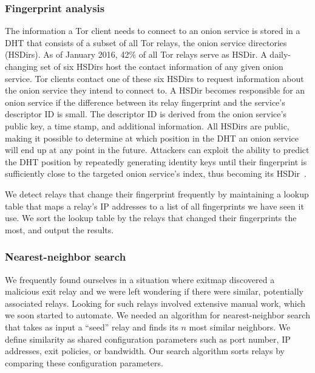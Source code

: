 \subsubsection{Fingerprint analysis}
\label{sec:fingerprint-analysis}
The information a Tor client needs to connect to an onion service is stored in a
DHT that consists of a subset of all Tor relays, the onion service directories
(HSDirs).  As of January 2016, 42\% of all Tor relays serve as HSDir.  A
daily-changing set of six HSDirs host the contact information of any given
onion service.  Tor clients contact one of these six HSDirs to request
information about the onion service they intend to connect to.  A HSDir becomes
responsible for an onion service if the difference between its relay fingerprint
and the service's descriptor ID is small.  The descriptor ID is derived from the
onion service's public key, a time stamp, and additional information.
All HSDirs are public, making it possible to determine at which position in the
DHT an onion service will end up at any point in the future.  Attackers can
exploit the ability to predict the DHT position by repeatedly generating
identity keys until their fingerprint is sufficiently close to the targeted
onion service's index, thus becoming its HSDir~\cite{Biryukov2013a}.

We detect relays that change their fingerprint frequently by maintaining a
lookup table that maps a relay's IP addresses to a list of all fingerprints we
have seen it use.  We sort the lookup table by the relays that changed their
fingerprints the most, and output the results.

\subsubsection{Nearest-neighbor search}
\label{sec:nearest-neighbor}
We frequently found ourselves in a situation where exitmap discovered a
malicious exit relay and we were left wondering if there were similar,
potentially associated relays.  Looking for such relays involved extensive
manual work, which we soon started to automate.  We needed an algorithm for
nearest-neighbor search that takes as input a ``seed'' relay and finds its $n$
most similar neighbors.  We define similarity as shared configuration parameters
such as port number, IP addresses, exit policies, or bandwidth.  Our search
algorithm sorts relays by comparing these configuration parameters.


